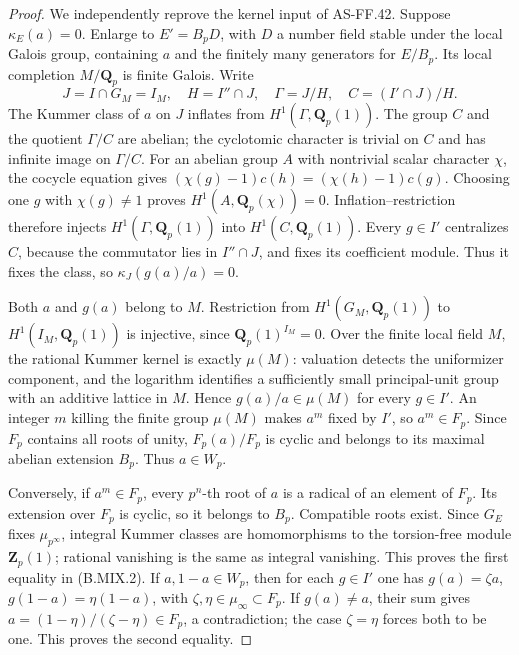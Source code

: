 \documentclass[11pt,a4paper]{article}
\newcommand{\Z}{\mathbf Z}
\newcommand{\Q}{\mathbf Q}
\begin{document}
\begin{proof}
We independently reprove the kernel input of AS-FF.42. Suppose
\(\kappa_E(a)=0\). Enlarge to \(E'=B_pD\), with \(D\) a number
field stable under the local Galois group, containing \(a\) and the
finitely many generators for \(E/B_p\). Its local completion
\(M/\Q_p\) is finite Galois. Write
\[
 J=I\cap G_M=I_M,\quad H=I''\cap J,
 \quad\Gamma=J/H,\quad C=(I'\cap J)/H.
\]
The Kummer class of \(a\) on \(J\) inflates from
\(H^1(\Gamma,\Q_p(1))\). The group \(C\) and the quotient
\(\Gamma/C\) are abelian; the cyclotomic character is trivial
on \(C\) and has infinite image on \(\Gamma/C\).
For an abelian group \(A\) with nontrivial scalar character \(\chi\),
the cocycle equation gives
\((\chi(g)-1)c(h)=(\chi(h)-1)c(g)\). Choosing one
\(g\) with \(\chi(g)\ne1\) proves \(H^1(A,\Q_p(\chi))=0\).
Inflation--restriction therefore injects
\(H^1(\Gamma,\Q_p(1))\) into \(H^1(C,\Q_p(1))\).
Every \(g\in I'\) centralizes \(C\), because the commutator
lies in \(I''\cap J\), and fixes its coefficient module.
Thus it fixes the class, so
\(\kappa_J(g(a)/a)=0\).

Both \(a\) and \(g(a)\) belong to \(M\). Restriction from
\(H^1(G_M,\Q_p(1))\) to \(H^1(I_M,\Q_p(1))\) is injective,
since \(\Q_p(1)^{I_M}=0\). Over the finite local field \(M\),
the rational Kummer kernel is exactly \(\mu(M)\): valuation
detects the uniformizer component, and the logarithm identifies a
sufficiently small principal-unit group with an additive lattice
in \(M\). Hence \(g(a)/a\in\mu(M)\) for every \(g\in I'\).
An integer \(m\) killing the finite group \(\mu(M)\) makes
\(a^m\) fixed by \(I'\), so \(a^m\in F_p\).
Since \(F_p\) contains all roots of unity,
\(F_p(a)/F_p\) is cyclic and belongs to its maximal abelian
extension \(B_p\). Thus \(a\in W_p\).

Conversely, if \(a^m\in F_p\), every \(p^n\)-th root of
\(a\) is a radical of an element of \(F_p\). Its extension
over \(F_p\) is cyclic, so it belongs to \(B_p\).
Compatible roots exist. Since \(G_E\) fixes \(\mu_{p^\infty}\),
integral Kummer classes are homomorphisms to the torsion-free
module \(\Z_p(1)\); rational vanishing is the same as integral
vanishing. This proves the first equality in (B.MIX.2).
If \(a,1-a\in W_p\), then for each \(g\in I'\) one has
\(g(a)=\zeta a\), \(g(1-a)=\eta(1-a)\), with
\(\zeta,\eta\in\mu_\infty\subset F_p\).
If \(g(a)\ne a\), their sum gives
\(a=(1-\eta)/(\zeta-\eta)\in F_p\), a contradiction;
the case \(\zeta=\eta\) forces both to be one.
This proves the second equality.


\end{proof}
\end{document}
